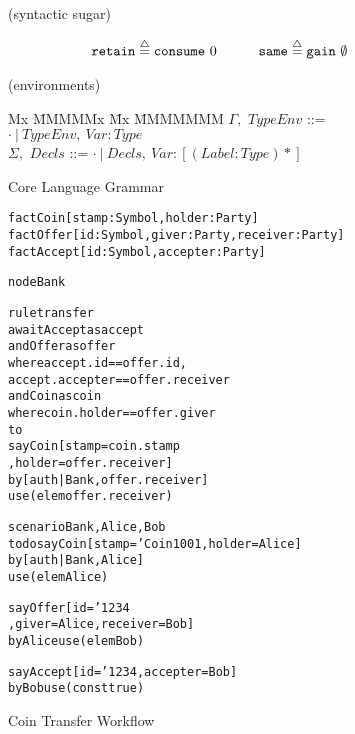 \begin{figure}
\medskip
\begin{flushleft}
(syntactic sugar)
\end{flushleft}
$$
\begin{array}{cc}
   \texttt{retain} \stackrel{\triangle}{=} \texttt{consume}~ 0
\quad & \quad
   \texttt{same}   \stackrel{\triangle}{=} \texttt{gain}~ \emptyset
\end{array}
$$

\medskip
\begin{flushleft}
(environments)
\begin{tabbing}
Mx              \= MMMMMx       \= Mx \= MMMMMMM \kill
   $\Gamma,$       \> $TypeEnv$    \> ::= \> $\cdot ~|~ TypeEnv,~ Var : Type$
\\ $\Sigma,$       \> $Decls$      \> ::= \> $\cdot ~|~ Decls,~ Var : [(Label : Type)*]$
\end{tabbing}
\end{flushleft}


\caption{Core Language Grammar}
\end{figure}







\begin{figure}
\begin{small}
\begin{alltt}
fact  Coin   [stamp: Symbol, holder: Party]
fact  Offer  [id: Symbol, giver: Party, receiver: Party]
fact  Accept [id: Symbol, accepter: Party]

node  Bank

rule  transfer
await Accept  as accept
 and  Offer   as offer
      where   accept.id       == offer.id,
              accept.accepter == offer.receiver
 and  Coin    as coin
      where   coin.holder     == offer.giver
to
      say Coin [ stamp  = coin.stamp
               , holder = offer.receiver]
      by  [auth| Bank, offer.receiver]
      use (elem offer.receiver)

scenario Bank, Alice, Bob
to do say Coin   [ stamp = 'Coin1001, holder = Alice]
      by  [auth| Bank, Alice]
      use (elem Alice)

      say Offer  [ id    = '1234
                 , giver = Alice, receiver = Bob]
      by  Alice use (elem Bob)

      say Accept [ id = '1234,    accepter = Bob]
      by  Bob   use (const true)
\end{alltt}
\end{small}

\caption{Coin Transfer Workflow}
\label{f:CoinTransferDesugared}
\end{figure}


